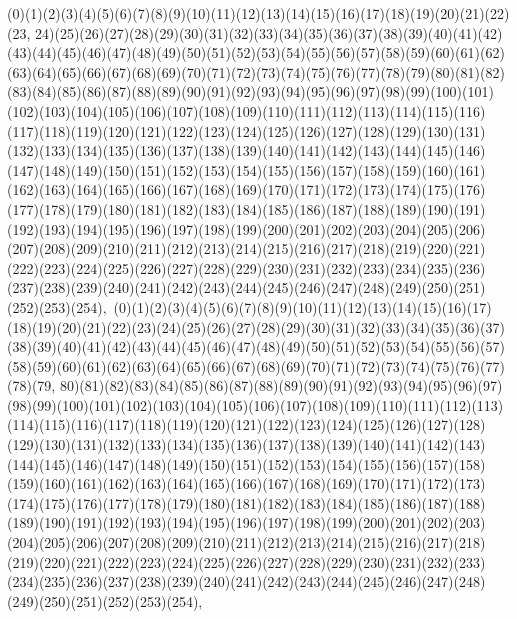 \documentclass[12pt]{article}
\begin{document}
{(0)(1)(2)(3)(4)(5)(6)(7)(8)(9)(10)(11)(12)(13)(14)(15)(16)(17)(18)(19)(20)(21)(22)(23, 24)(25)(26)(27)(28)(29)(30)(31)(32)(33)(34)(35)(36)(37)(38)(39)(40)(41)(42)(43)(44)(45)(46)(47)(48)(49)(50)(51)(52)(53)(54)(55)(56)(57)(58)(59)(60)(61)(62)(63)(64)(65)(66)(67)(68)(69)(70)(71)(72)(73)(74)(75)(76)(77)(78)(79)(80)(81)(82)(83)(84)(85)(86)(87)(88)(89)(90)(91)(92)(93)(94)(95)(96)(97)(98)(99)(100)(101)(102)(103)(104)(105)(106)(107)(108)(109)(110)(111)(112)(113)(114)(115)(116)(117)(118)(119)(120)(121)(122)(123)(124)(125)(126)(127)(128)(129)(130)(131)(132)(133)(134)(135)(136)(137)(138)(139)(140)(141)(142)(143)(144)(145)(146)(147)(148)(149)(150)(151)(152)(153)(154)(155)(156)(157)(158)(159)(160)(161)(162)(163)(164)(165)(166)(167)(168)(169)(170)(171)(172)(173)(174)(175)(176)(177)(178)(179)(180)(181)(182)(183)(184)(185)(186)(187)(188)(189)(190)(191)(192)(193)(194)(195)(196)(197)(198)(199)(200)(201)(202)(203)(204)(205)(206)(207)(208)(209)(210)(211)(212)(213)(214)(215)(216)(217)(218)(219)(220)(221)(222)(223)(224)(225)(226)(227)(228)(229)(230)(231)(232)(233)(234)(235)(236)(237)(238)(239)(240)(241)(242)(243)(244)(245)(246)(247)(248)(249)(250)(251)(252)(253)(254)$
, 
$
(0)(1)(2)(3)(4)(5)(6)(7)(8)(9)(10)(11)(12)(13)(14)(15)(16)(17)(18)(19)(20)(21)(22)(23)(24)(25)(26)(27)(28)(29)(30)(31)(32)(33)(34)(35)(36)(37)(38)(39)(40)(41)(42)(43)(44)(45)(46)(47)(48)(49)(50)(51)(52)(53)(54)(55)(56)(57)(58)(59)(60)(61)(62)(63)(64)(65)(66)(67)(68)(69)(70)(71)(72)(73)(74)(75)(76)(77)(78)(79, 80)(81)(82)(83)(84)(85)(86)(87)(88)(89)(90)(91)(92)(93)(94)(95)(96)(97)(98)(99)(100)(101)(102)(103)(104)(105)(106)(107)(108)(109)(110)(111)(112)(113)(114)(115)(116)(117)(118)(119)(120)(121)(122)(123)(124)(125)(126)(127)(128)(129)(130)(131)(132)(133)(134)(135)(136)(137)(138)(139)(140)(141)(142)(143)(144)(145)(146)(147)(148)(149)(150)(151)(152)(153)(154)(155)(156)(157)(158)(159)(160)(161)(162)(163)(164)(165)(166)(167)(168)(169)(170)(171)(172)(173)(174)(175)(176)(177)(178)(179)(180)(181)(182)(183)(184)(185)(186)(187)(188)(189)(190)(191)(192)(193)(194)(195)(196)(197)(198)(199)(200)(201)(202)(203)(204)(205)(206)(207)(208)(209)(210)(211)(212)(213)(214)(215)(216)(217)(218)(219)(220)(221)(222)(223)(224)(225)(226)(227)(228)(229)(230)(231)(232)(233)(234)(235)(236)(237)(238)(239)(240)(241)(242)(243)(244)(245)(246)(247)(248)(249)(250)(251)(252)(253)(254)$
, 
$
}
\end{document}
